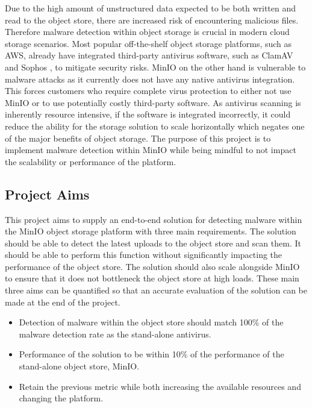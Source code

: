 \documentclass[12pt, conference, final, a4paper, onecolumn, compsoc]{IEEEtran}
\begin{document}
    Due to the high amount of unstructured data expected to be both written and
    read to the object store, there are increased risk of encountering malicious
    files. Therefore malware detection within object storage is crucial in
    modern cloud storage scenarios. Most popular off-the-shelf object storage
    platforms, such as AWS, already have integrated third-party antivirus
    software, such as ClamAV and Sophos \citep{amazon-md}, to mitigate security
    risks. MinIO on the other hand is vulnerable to malware attacks as it
    currently does not have any native antivirus integration. This forces
    customers who require complete virus protection to either not use MinIO or
    to use potentially costly third-party software. As antivirus scanning is
    inherently resource intensive, if the software is integrated incorrectly, it
    could reduce the ability for the storage solution to scale horizontally
    which negates one of the major benefits of object storage. The purpose of
    this project is to implement malware detection within MinIO while being
    mindful to not impact the scalability or performance of the platform.

    \subsection*{Project Aims} %

    This project aims to supply an end-to-end solution for detecting malware
    within the MinIO object storage platform with three main requirements. The
    solution should be able to detect the latest uploads to the object store and
    scan them. It should be able to perform this function without significantly
    impacting the performance of the object store. The solution should also
    scale alongside MinIO to ensure that it does not bottleneck the object store
    at high loads. These main three aims can be quantified so that an accurate
    evaluation of the solution can be made at the end of the project.

    \begin{itemize}
      \item Detection of malware within the object store should match 100\%
      of the malware detection rate as the stand-alone antivirus.
      \item Performance of the solution to be within 10\% of the performance of
      the stand-alone object store, MinIO.
      \item Retain the previous metric while both increasing the available
      resources and changing the platform.
    \end{itemize}
\end{document}
